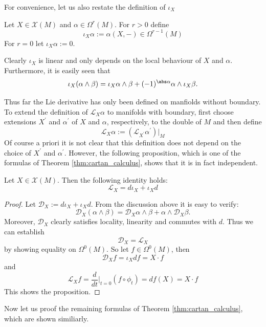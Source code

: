 For convenience, let us also restate the definition of $\iota_X$
\begin{definition}
    Let $X \in \mathscr{X}(M)$ and $\alpha \in \Omega^r(M)$. For $r > 0$ define
    \[
    \iota_X \alpha := \alpha(X,-) \in \Omega^{r-1}(M)
    \]
    For $r=0$ let $\iota_X \alpha := 0$.
\end{definition}

Clearly $\iota_X$ is linear and only depends on the local behaviour of $X$ and $\alpha$. Furthermore, it is easily seen that 
\[
\iota_X(\alpha \wedge \beta) = \iota_X\alpha \wedge \beta + (-1)^{\abs \alpha} \alpha \wedge \iota_X\beta.
\]

Thus far the Lie derivative has only been defined on manfiolds without boundary. To extend the definition of $\mathcal{L}_X\alpha$ to manifolds with boundary, first choose extensions $X^\prime$ and $\alpha^\prime$ of $X$ and $\alpha$, respectively, to the double of $M$ and then define
\[
\mathcal{L}_X \alpha := (\mathcal{L}_{X^\prime}\alpha^\prime)|_M
\]
Of course a priori it is not clear that this definition does not depend on the choice of $X^\prime$ and $\alpha^\prime$. However, the following proposition, which is one of the formulas of Theorem \ref{thm:cartan_calculus}, shows that it is in fact independent.

\begin{proposition}
    Let $X \in \mathscr{X}(M)$. Then the following identity holds:
    \[\mathcal{L}_X = d\iota_X + \iota_Xd\]
\end{proposition}
\begin{proof}
    Let $\mathcal{D}_X := d\iota_X + \iota_Xd$. From the discussion above it is easy to verify:
    \[
    \mathcal{D}_X(\alpha \wedge \beta) = \mathcal{D}_X\alpha \wedge \beta + \alpha \wedge \mathcal{D}_X\beta.
    \]
    Moreover, $\mathcal{D}_X$ clearly satisfies locality, linearity and commutes with $d$. Thus we can establish 
    \[
    \mathcal{D}_X = \mathcal{L}_X
    \]
    by showing equality on $\Omega^0(M)$. So let $f \in \Omega^0(M)$, then 
    \[
    \mathcal{D}_X f = \iota_Xdf = X \cdot f
    \]
    and
    \[
    \mathcal{L}_Xf = \frac{d}{dt}\bigg|_{t=0} (f \circ \phi_t) = df(X) = X \cdot f
    \]
    This shows the proposition.
\end{proof}

Now let us proof the remaining formulas of Theorem \ref{thm:cartan_calculus}, which are shown similiarly.

